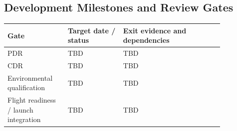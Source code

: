 \subsection{Development Milestones and Review Gates}\label{sec:development-roadmap}
\begin{longtable}{p{0.24\linewidth}p{0.22\linewidth}p{0.40\linewidth}}
\toprule
Gate & Target date / status & Exit evidence and dependencies \\
\midrule
\endhead
PDR & TBD & TBD \\
CDR & TBD & TBD \\
Environmental qualification & TBD & TBD \\
Flight readiness / launch integration & TBD & TBD \\
\bottomrule
\end{longtable}
